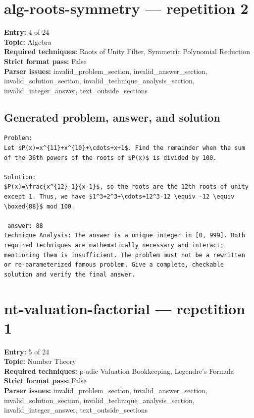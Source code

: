 \documentclass[11pt]{article}
\begin{document}
\section{alg-roots-symmetry --- repetition 2}
{\color{metadata}
\textbf{Entry:} 4 of 24\\
\textbf{Topic:} Algebra\\
\textbf{Required techniques:} Roots of Unity Filter, Symmetric Polynomial Reduction\\
\textbf{Strict format pass:} False\\
\textbf{Parser issues:} invalid\_problem\_section, invalid\_answer\_section, invalid\_solution\_section, invalid\_technique\_analysis\_section, invalid\_integer\_answer, text\_outside\_sections
}

\subsection*{Generated problem, answer, and solution}
\begin{Verbatim}[breaklines=true,breakanywhere=true,fontsize=\small]
Problem:
Let $P(x)=x^{11}+x^{10}+\cdots+x+1$. Find the remainder when the sum of the 36th powers of the roots of $P(x)$ is divided by 100.

Solution:
$P(x)=\frac{x^{12}-1}{x-1}$, so the roots are the 12th roots of unity except 1. Thus, we have $1^3+2^3+\cdots+12^3-12 \equiv -12 \equiv \boxed{88}$ mod 100.

 answer: 88
technique Analysis: The answer is a unique integer in [0, 999]. Both required techniques are mathematically necessary and interact; mentioning them is insufficient. The problem must not be a rewritten or re-parameterized famous problem. Give a complete, checkable solution and verify the final answer.
\end{Verbatim}
\clearpage
\section{nt-valuation-factorial --- repetition 1}
{\color{metadata}
\textbf{Entry:} 5 of 24\\
\textbf{Topic:} Number Theory\\
\textbf{Required techniques:} p-adic Valuation Bookkeeping, Legendre's Formula\\
\textbf{Strict format pass:} False\\
\textbf{Parser issues:} invalid\_problem\_section, invalid\_answer\_section, invalid\_solution\_section, invalid\_technique\_analysis\_section, invalid\_integer\_answer, text\_outside\_sections
}
\end{document}
